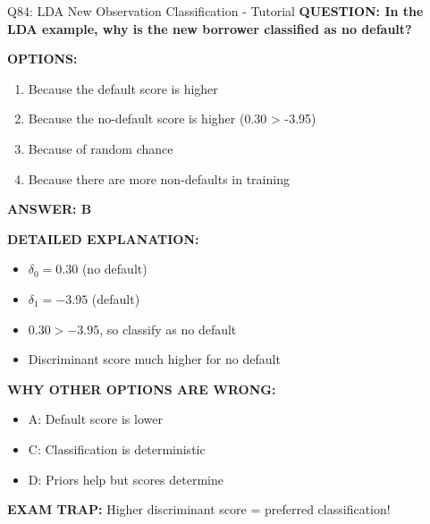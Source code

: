\documentclass[8pt]{beamer}
\begin{document}
	\begin{frame}{Q84: LDA New Observation Classification - Tutorial}
		\fontsize{6.5}{7.5}\selectfont
		\textbf{QUESTION: In the LDA example, why is the new borrower classified as no default?}
		
		\vspace{0.1cm}
		\textbf{OPTIONS:}
		\begin{enumerate}
			\item Because the default score is higher
			\item Because the no-default score is higher (0.30 > -3.95)
			\item Because of random chance
			\item Because there are more non-defaults in training
		\end{enumerate}
		
		\vspace{0.1cm}
		\textcolor{myblue}{\textbf{ANSWER: B}}
		
		\vspace{0.1cm}
		\textbf{DETAILED EXPLANATION:}
		\begin{itemize}
			\item $\delta_0 = 0.30$ (no default)
			\item $\delta_1 = -3.95$ (default)
			\item $0.30 > -3.95$, so classify as no default
			\item Discriminant score much higher for no default
		\end{itemize}
		
		\vspace{0.1cm}
		\textcolor{myred}{\textbf{WHY OTHER OPTIONS ARE WRONG:}}
		\begin{itemize}
			\item \textcolor{myred}{A:} Default score is lower
			\item \textcolor{myred}{C:} Classification is deterministic
			\item \textcolor{myred}{D:} Priors help but scores determine
		\end{itemize}
		
		\textcolor{myred}{\textbf{EXAM TRAP:}} Higher discriminant score = \textcolor{myblue}{preferred classification}!
	\end{frame}
	
\end{document}
